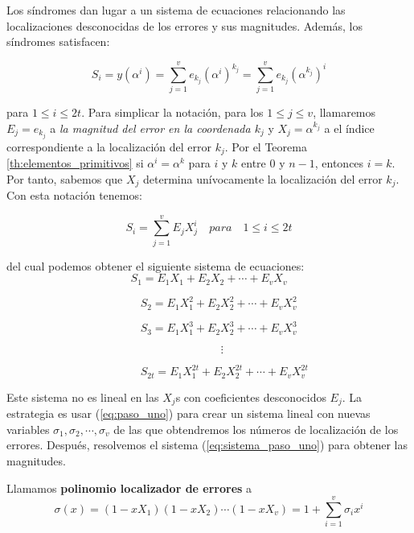 Los síndromes dan lugar a un sistema de ecuaciones relacionando las localizaciones desconocidas de los errores y sus magnitudes. Además, los síndromes satisfacen:

\[ 
S_i = y(\alpha^i) = \sum_{j=1}^v e_{k_j}(\alpha^i)^{k_j} = \sum_{j=1}^v e_{k_j}(\alpha^{k_j})^i
\]

para $1 \leq i \leq 2t$. Para simplicar la notación, para los $1 \leq j \leq v$, llamaremos $E_j = e_{k_j}$ a \textit{la magnitud del error en la coordenada $k_j$} y  $X_j = \alpha^{k_j}$ a el índice correspondiente a la localización del error $k_j$. Por el Teorema \ref{th:elementos_primitivos}  %
si $\alpha^i = \alpha^k$ para $i$ y $k$ entre $0$ y $n-1$, entonces $i = k$. Por tanto, sabemos que $X_j$ determina unívocamente la localización del error $k_j$. Con esta notación tenemos:

\begin{equation}
\label{eq:paso_uno}
S_i =  \sum_{j=1}^v E_jX_j^i \quad para \quad 1 \leq i \leq 2t
\end{equation} 



del cual podemos obtener el siguiente sistema de ecuaciones:
\begin{equation}
\label{eq:sistema_paso_uno} S_1 = E_1X_1 + E_2X_2 + \cdots + E_vX_v 
 \end{equation}
 
  $\hspace{5cm} S_2 = E_1X_1^2 + E_2X_2^2 + \cdots + E_vX_v^2$ 
 
  $\hspace{5cm} S_3 = E_1X_1^3 + E_2X_2^3 + \cdots + E_vX_v^3 $
  
   $\hspace{8cm} \vdots $
     
  $\hspace{5cm} S_{2t} = E_1X_1^{2t} + E_2X_2^{2t} + \cdots + E_vX_v^{2t}$




Este sistema no es lineal en las $X_j$s con coeficientes desconocidos $E_j$. La estrategia es usar (\ref{eq:paso_uno}) para crear un sistema lineal con nuevas variables $\sigma_1,\sigma_2, \cdots, \sigma_v$ de las que obtendremos los números de localización de los errores. Después, resolvemos el sistema (\ref{eq:sistema_paso_uno}) para obtener las magnitudes.

\begin{definition}
Llamamos \textbf{polinomio localizador de errores} a 
\[ 
\sigma(x) = (1-xX_1)(1-xX_2)\cdots(1-xX_v) = 1 + \sum_{i=1}^v \sigma_ix^i
\]
\end{definition}

